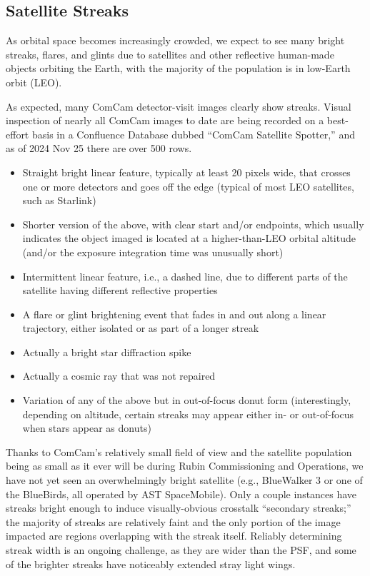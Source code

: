 \subsection{Satellite Streaks}

As orbital space becomes increasingly crowded, we expect to see many bright streaks, flares, and glints due to
satellites and other reflective human-made objects orbiting the Earth, with the majority of the population is in low-Earth orbit (LEO).

As expected, many ComCam detector-visit images clearly show streaks. Visual inspection of nearly all ComCam images to date are being recorded on a best-effort basis in a Confluence Database dubbed ``ComCam Satellite Spotter,'' and as of 2024 Nov 25 there are over 500 rows. 
\begin{itemize}
\item Straight bright linear feature, typically at least 20 pixels wide, that crosses one or more detectors and goes off the edge (typical of most LEO satellites, such as Starlink)
\item Shorter version of the above, with clear start and/or endpoints, which usually indicates the object imaged is located at a higher-than-LEO orbital altitude (and/or the exposure integration time was unusually short)
\item Intermittent linear feature, i.e., a dashed line, due to different parts of the satellite having different reflective properties
\item A flare or glint brightening event that fades in and out along a linear trajectory, either isolated or as part of a longer streak
\item Actually a bright star diffraction spike
\item Actually a cosmic ray that was not repaired
\item Variation of any of the above but in out-of-focus donut form (interestingly, depending on altitude, certain streaks may appear either in- or out-of-focus when stars appear as donuts)
\end{itemize}

Thanks to ComCam's relatively small field of view and the satellite population being as small as it ever will
be during Rubin Commissioning and Operations, we have not yet seen an overwhelmingly bright satellite (e.g.,
BlueWalker 3 or one of the BlueBirds, all operated by AST SpaceMobile). Only a couple instances have streaks
bright enough to induce visually-obvious crosstalk ``secondary streaks;'' the majority of streaks are
relatively faint and the only portion of the image impacted are regions overlapping with the streak itself.
Reliably determining streak width is an ongoing challenge, as they are wider than the PSF, and some of
the brighter streaks have noticeably extended stray light wings.
